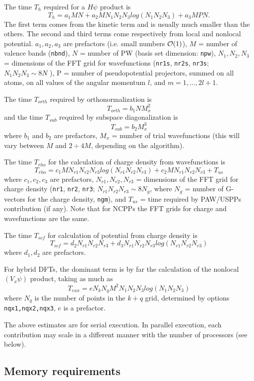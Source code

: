 \documentclass[12pt,a4paper]{article}
\begin{document}
The time $T_h$ required for a $H\psi$ product is
$$T_h = a_1 M N + a_2 M N_1 N_2 N_3 log(N_1 N_2 N_3 ) + a_3 M P N. $$
The first term comes from the kinetic term and is usually much smaller
than the others. The second and third terms come respectively from local
and nonlocal potential. $a_1, a_2, a_3$ are prefactors (i.e.
small numbers ${\cal O}(1)$), $M$ = number of valence
bands (\texttt{nbnd}), $N$ = number of PW (basis set dimension: \texttt{npw}), $N_1, N_2, N_3$ =
dimensions of the FFT grid for wavefunctions (\texttt{nr1s}, \texttt{nr2s},
\texttt{nr3s}; $N_1 N_2 N_3 \sim 8N$ ), 
P = number of pseudopotential projectors, summed on all atoms, on all values of the
angular momentum $l$, and $m = 1, . . . , 2l + 1$.

The time $T_{orth}$ required by orthonormalization is
$$T_{orth} = b_1 N M_x^2$$ 
and the time $T_{sub}$ required by subspace diagonalization is
$$T_{sub} = b_2 M_x^3$$
where $b_1$ and $b_2$ are prefactors, $M_x$ = number of trial wavefunctions 
(this will vary between $M$ and $2\div4 M$, depending on the algorithm).
    
The time $T_{rho}$ for the calculation of charge density from wavefunctions is
$$T_{rho} = c_1 M N_{r1} N_{r2}N_{r3} log(N_{r1} N_{r2} N_{r3}) + 
            c_2 M N_{r1} N_{r2} N_{r3} + T_{us}$$
where $c_1, c_2, c_3$ are prefactors, $N_{r1}, N_{r2}, N_{r3}$ =
dimensions of the FFT grid for charge density (\texttt{nr1},
\texttt{nr2}, \texttt{nr3}; $N_{r1} N_{r2} N_{r3} \sim 8N_g$,
where $N_g$ = number of G-vectors for the charge density,
\texttt{ngm}), and 
$T_{us}$ = time required by PAW/USPPs contribution (if any).
Note that for NCPPs the FFT grids for charge and
wavefunctions are the same.
 
The time $T_{scf}$ for calculation of potential from charge density is
$$T_{scf} = d_2 N_{r1} N_{r2} N_{r3} + d_3 N_{r1} N_{r2} N_{r3} 
            log(N_{r1} N_{r2} N_{r3} )$$
where $d_1, d_2$ are prefactors.

For hybrid DFTs, the dominant term is by far the calculation of the 
nonlocal $(V_x\psi)$ product, taking as much as
$$T_{exx} = e N_k N_q M^2 N_1 N_2N_3 log(N_1 N_2 N_3)$$
where $N_q$ is the number of points in the $k+q$ grid, determined by
options \texttt{nqx1,nqx2,nqx3}, $e$ is a prefactor.

The above estimates are for serial execution. In parallel execution,
each contribution may scale in a different manner with the number of processors (see below).

\subsection{Memory requirements}
\end{document}
